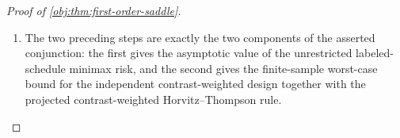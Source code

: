 \begin{proof}[Proof of \cref{obj:thm:first-order-saddle}]
\begin{enumerate}
For every \(y\in[-L_c/2,L_c/2]\) and every real \(x\),
\[
\left\{
\operatorname{proj}_{[-L_c/2,L_c/2]}(x)-y
\right\}^2
\le
(x-y)^2.
\]
Indeed, if \(x\) lies in the interval there is equality; if \(x<-L_c/2\), then
\(0\le y+L_c/2\le y-x\); and if \(x>L_c/2\), then
\(0\le L_c/2-y\le x-y\). Squaring gives the displayed inequality in the two boundary cases. Applying it with \(y=\tau_c(z)\) shows, pointwise in the assignment,
\[
\left\{
\widehat\tau_{\mathrm{cHT}}^\star(A,Y^{\mathrm{obs}})
-\tau_c(z)
\right\}^2
\le
\left\{
\widetilde\tau_{\mathrm{raw}}(A,z)-\tau_c(z)
\right\}^2.
\]
Consequently,
\[
R_n(\mathcal D^\star,\widehat\tau_{\mathrm{cHT}}^\star;z)
\le
\frac{C_0(c)}{n}.
\]
Since \(z\) was arbitrary,
\[
\max_{z\in\mathcal T_K^n}
R_n(\mathcal D^\star,\widehat\tau_{\mathrm{cHT}}^\star;z)
\le
\frac{C_0(c)}{n}.
\]

\item The two preceding steps are exactly the two components of the asserted conjunction: the first gives the asymptotic value of the unrestricted labeled-schedule minimax risk, and the second gives the finite-sample worst-case bound for the independent contrast-weighted design together with the projected contrast-weighted Horvitz--Thompson rule. %
\end{enumerate}
\end{proof}

